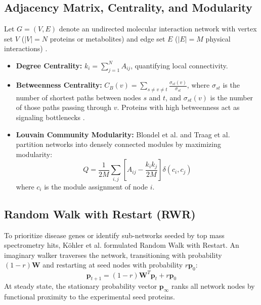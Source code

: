\documentclass[11pt,oneside]{book}
\begin{document}
\subsection{Adjacency Matrix, Centrality, and Modularity}
Let $G = (V, E)$ denote an undirected molecular interaction network with vertex set $V$ ($|V| = N$ proteins or metabolites) and edge set $E$ ($|E| = M$ physical interactions) \cite{csardi2006igraph, shannon2003cytoscape}.
\begin{itemize}
    \item \textbf{Degree Centrality:} $k_i = \sum_{j=1}^N A_{ij}$, quantifying local connectivity.
    \item \textbf{Betweenness Centrality:} $C_B(v) = \sum_{s \ne v \ne t} \frac{\sigma_{st}(v)}{\sigma_{st}}$, where $\sigma_{st}$ is the number of shortest paths between nodes $s$ and $t$, and $\sigma_{st}(v)$ is the number of those paths passing through $v$. Proteins with high betweenness act as signaling bottlenecks \cite{barabasi2004network}.
    \item \textbf{Louvain Community Modularity:} Blondel et al. \cite{blondel2008fast} and Traag et al. \cite{traag2019louvain} partition networks into densely connected modules by maximizing modularity:
    \begin{equation}
    Q = \frac{1}{2M} \sum_{i,j} \left[ A_{ij} - \frac{k_i k_j}{2M} \right] \delta(c_i, c_j)
    \end{equation}
    where $c_i$ is the module assignment of node $i$.
\end{itemize}

\subsection{Random Walk with Restart (RWR)}
To prioritize disease genes or identify sub-networks seeded by top mass spectrometry hits, K{\"o}hler et al. \cite{kohler2008walking} formulated Random Walk with Restart. An imaginary walker traverses the network, transitioning with probability $(1 - r)\mathbf{W}$ and restarting at seed nodes with probability $r \mathbf{p}_0$:
\begin{equation}
\mathbf{p}_{t+1} = (1 - r)\mathbf{W}^T \mathbf{p}_t + r \mathbf{p}_0
\end{equation}
At steady state, the stationary probability vector $\mathbf{p}_\infty$ ranks all network nodes by functional proximity to the experimental seed proteins.

\end{document}
